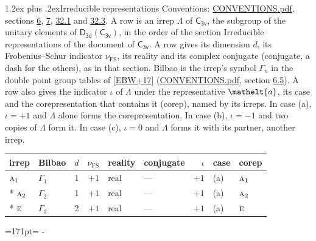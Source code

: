 \documentclass[10pt,a4paper]{article}
\makeatletter
\renewcommand\section{\@startsection{section}{1}{\z@}{-3ex plus -1ex minus -.2ex}%
  {1.2ex plus .2ex}{\normalfont\large\sffamily\bfseries\color{parttitle}}}
\newcommand{\needspace}[1]{\par\penalty-100\begingroup\dimen0=#1\relax\dimen2=\pagegoal
  \advance\dimen2-\pagetotal\ifdim\dimen0>\dimen2\relax\ifdim\dimen2>0pt\vfil\break\fi\fi
  \endgroup}
\numberwithin{equation}{section}
\newcommand{\eltfont}[1]{{\let\sigma\eltsigma\mathelt{#1}}}
\newcommand{\grp}[1]{\mathsf{#1}}
\newcommand{\irr}[1]{\text{\normalfont\scshape #1}}
\newcommand{\elt}[1]{\eltfont{#1}}
\newcommand{\fsind}{\nu_{\mathrm{FS}}}
\makeatother
\begin{document}
\section{Irreducible representations}\label{s:irreps}
Conventions: \href{../../CONVENTIONS.pdf}{CONVENTIONS.pdf}, sections \href{../../../rotation/CONVENTIONS.pdf\#conv.6}{6}, \href{../../../rotation/CONVENTIONS.pdf\#conv.7}{7}, \href{../../CONVENTIONS.pdf\#conv.32.1}{32.1} and \href{../../CONVENTIONS.pdf\#conv.32.3}{32.3}.
\leavevmode\label{n:irrep.Delta}A row is an irrep $\Lambda$ of $\grp{C_{3v}}$, the subgroup of the unitary elements of $\grp{D_{3d}}(\grp{C_{3v}})$, in the order of the section Irreducible representations of the document of \href{../../../rotation/data/pdf/C3v.pdf}{$\grp{C_{3v}}$}. \label{n:index.dimension}\label{n:index.frobenius}\label{n:head.irrep}\label{n:head.reality}\label{n:head.conjugate}A row gives its dimension $d$, its Frobenius--Schur indicator $\fsind$, its reality and its complex conjugate (conjugate, a dash for the others), as in that section. \label{n:head.bilbao}\label{n:irrep.alias.gamma}Bilbao is the irrep's symbol $\Gamma_n$ in the double point group tables of [\href{../../../REFERENCES.pdf\#ref.EBW+17}{EBW+17}] (\href{../../CONVENTIONS.pdf}{CONVENTIONS.pdf}, section \href{../../../rotation/CONVENTIONS.pdf\#conv.6.5}{6.5}). \label{n:head.case.corep}\label{n:head.corep}A row also gives the indicator $\iota$ of $\Lambda$ under the representative $\elt{a}$, its case and the corepresentation that contains it (corep), named by its irreps. In case (a), $\iota = +1$ and $\Lambda$ alone forms the corepresentation. In case (b), $\iota = -1$ and two copies of $\Lambda$ form it. In case (c), $\iota = 0$ and $\Lambda$ forms it with its partner, another irrep.
\setlength{\emergencystretch}{2em}\par\setlength{\emergencystretch}{0pt}
{\small\renewcommand{\arraystretch}{1.25}\setlength{\tabcolsep}{4pt}\begin{longtable}{@{}llrrllrll@{}}\toprule
irrep & Bilbao & $d$ & $\fsind$ & reality & conjugate & $\iota$ & case & corep\\\midrule\endhead
\bottomrule\endfoot\endlastfoot
$\irr{a}_{1}$ & $\Gamma_{1}$ & 1 & $+1$ & real & --- & $+1$ & (a) & $\irr{a}_{1}$\\*
$\irr{a}_{2}$ & $\Gamma_{2}$ & 1 & $+1$ & real & --- & $+1$ & (a) & $\irr{a}_{2}$\\*
$\irr{e}$ & $\Gamma_{3}$ & 2 & $+1$ & real & --- & $+1$ & (a) & $\irr{e}$\\
\bottomrule\end{longtable}}
\needspace{171pt}
\end{document}
